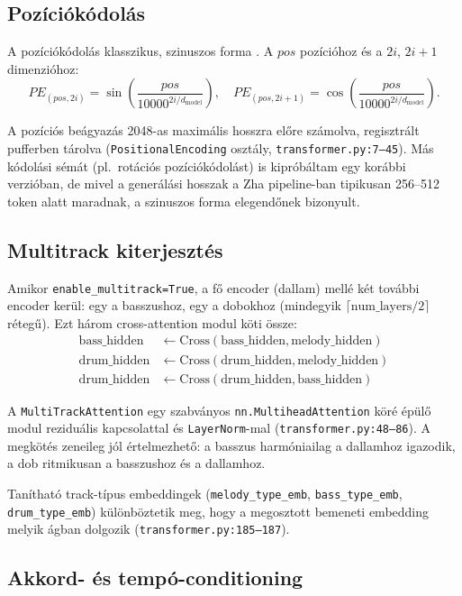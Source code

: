 \subsection{Pozíciókódolás}

A pozíciókódolás klasszikus, szinuszos forma \cite{vaswani2017attention}. A $pos$ pozícióhoz és a $2i$, $2i+1$ dimenzióhoz:
\[
PE_{(pos, 2i)} = \sin\!\left(\frac{pos}{10000^{2i/d_{\text{model}}}}\right), \quad
PE_{(pos, 2i+1)} = \cos\!\left(\frac{pos}{10000^{2i/d_{\text{model}}}}\right).
\]

A pozíciós beágyazás 2048-as maximális hosszra előre számolva, regisztrált pufferben tárolva (\texttt{PositionalEncoding} osztály, \texttt{transformer.py:7--45}). Más kódolási sémát (pl.\ rotációs pozíciókódolást) is kipróbáltam egy korábbi verzióban, de mivel a generálási hosszak a Zha pipeline-ban tipikusan 256--512 token alatt maradnak, a szinuszos forma elegendőnek bizonyult.

\subsection{Multitrack kiterjesztés}

Amikor \texttt{enable\_multitrack=True}, a fő encoder (dallam) mellé két további encoder kerül: egy a basszushoz, egy a dobokhoz (mindegyik \(\lceil \text{num\_layers}/2 \rceil\) rétegű). Ezt három cross-attention modul köti össze:
\[
\begin{aligned}
\mathrm{bass\_hidden} &\gets \mathrm{Cross}(\mathrm{bass\_hidden}, \mathrm{melody\_hidden})\\
\mathrm{drum\_hidden} &\gets \mathrm{Cross}(\mathrm{drum\_hidden}, \mathrm{melody\_hidden})\\
\mathrm{drum\_hidden} &\gets \mathrm{Cross}(\mathrm{drum\_hidden}, \mathrm{bass\_hidden})
\end{aligned}
\]

A \texttt{MultiTrackAttention} egy szabványos \texttt{nn.MultiheadAttention} köré épülő modul reziduális kapcsolattal és \texttt{LayerNorm}-mal (\texttt{transformer.py:48--86}). A megkötés zeneileg jól értelmezhető: a basszus harmóniailag a dallamhoz igazodik, a dob ritmikusan a basszushoz és a dallamhoz.

Tanítható track-típus embeddingek (\texttt{melody\_type\_emb}, \texttt{bass\_type\_emb}, \texttt{drum\_type\_emb}) különböztetik meg, hogy a megosztott bemeneti embedding melyik ágban dolgozik (\texttt{transformer.py:185--187}).

\subsection{Akkord- és tempó-conditioning}


